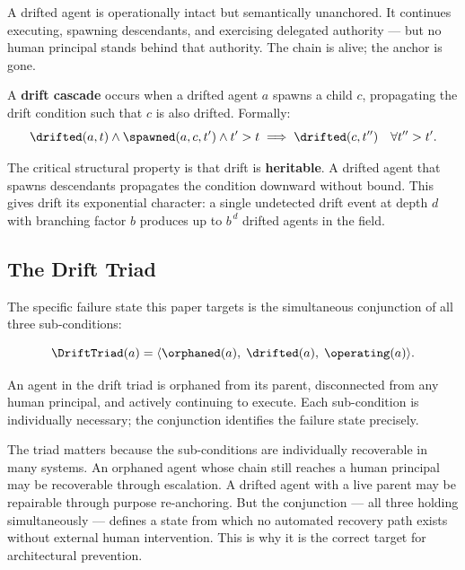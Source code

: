 A drifted agent is operationally intact but semantically unanchored. It continues executing, spawning descendants, and exercising delegated authority — but no human principal stands behind that authority. The chain is alive; the anchor is gone.

\begin{definition}
\label{def:drift-cascade}
A \textbf{drift cascade} occurs when a drifted agent $a$ spawns a child $c$, propagating the drift condition such that $c$ is also drifted. Formally:
\begin{equation}
\drifted(a, t) \land \spawned(a, c, t') \land t' > t \implies \drifted(c, t'') \quad \forall t'' > t'.
\label{eq:drift-cascade}
\end{equation}
\end{definition}

The critical structural property is that drift is \textbf{heritable}. A drifted agent that spawns descendants propagates the condition downward without bound. This gives drift its exponential character: a single undetected drift event at depth $d$ with branching factor $b$ produces up to $b^{\,d}$ drifted agents in the field.

\subsection{The Drift Triad}

The specific failure state this paper targets is the simultaneous conjunction of all three sub-conditions:

\begin{equation}
\DriftTriad(a) = \langle \orphaned(a),\; \drifted(a),\; \operating(a) \rangle.
\label{eq:drift-triad}
\end{equation}

An agent in the drift triad is orphaned from its parent, disconnected from any human principal, and actively continuing to execute. Each sub-condition is individually necessary; the conjunction identifies the failure state precisely.

The triad matters because the sub-conditions are individually recoverable in many systems. An orphaned agent whose chain still reaches a human principal may be recoverable through escalation. A drifted agent with a live parent may be repairable through purpose re-anchoring. But the conjunction — all three holding simultaneously — defines a state from which no automated recovery path exists without external human intervention. This is why it is the correct target for architectural prevention.


